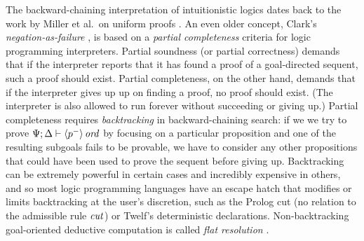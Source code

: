 The backward-chaining interpretation of intuitionistic logics dates
back to the work by Miller et al.~on uniform proofs
\cite{miller91uniform}.  An even older concept, Clark's {\it
  negation-as-failure} \cite{clark87negation}, is based on a {\it
  partial completeness} criteria for logic programming interpreters.
Partial soundness (or partial correctness) demands that if the
interpreter reports that it has found a proof of a goal-directed
sequent, such a proof should exist. Partial completeness, on the other
hand, demands that if the interpreter gives up up on finding a proof,
no proof should exist. (The interpreter is also allowed to run forever
without succeeding or giving up.)  Partial completeness requires {\it
  backtracking} in backward-chaining search: if we we try to prove
${\Psi};{\Delta} \vdash {{\langle {p^-} \rangle}\,{{\it ord}}} \mathstrut$ by focusing on a particular
proposition and one of the resulting subgoals fails to be provable, we
have to consider any other propositions that could have been used to
prove the sequent before giving up. Backtracking can be extremely
powerful in certain cases and incredibly expensive in others, and so
most logic programming languages have an escape hatch that modifies or
limits backtracking at the user's discretion, such as the Prolog cut
(no relation to the admissible rule ${\it cut}$) or Twelf's
deterministic declarations. Non-backtracking goal-oriented deductive
computation is called {\it flat resolution} \cite{aitkaci99warrens}.

